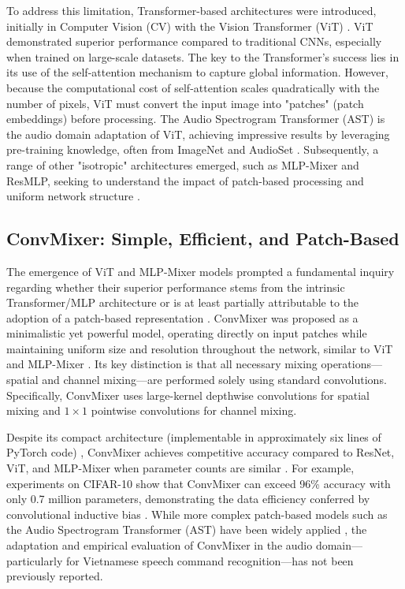 To address this limitation, Transformer-based architectures were introduced, initially in Computer Vision (CV) with the Vision Transformer (ViT) \cite{dosovitskiy2020image}. ViT demonstrated superior performance compared to traditional CNNs, especially when trained on large-scale datasets. The key to the Transformer's success lies in its use of the self-attention mechanism to capture global information. However, because the computational cost of self-attention scales quadratically with the number of pixels, ViT must convert the input image into "patches" (patch embeddings) before processing. The Audio Spectrogram Transformer (AST) is the audio domain adaptation of ViT, achieving impressive results by leveraging pre-training knowledge, often from ImageNet and AudioSet \cite{Gong2021AST, Deng2009ImageNet, Gemmeke2017AudioSet}. Subsequently, a range of other "isotropic" architectures emerged, such as MLP-Mixer and ResMLP, seeking to understand the impact of patch-based processing and uniform network structure \cite{Tolstikhin2021MLPMixer, Touvron2021ResMLP}.

\subsection*{ConvMixer: Simple, Efficient, and Patch-Based}

The emergence of ViT and MLP-Mixer models prompted a fundamental inquiry regarding whether their superior performance stems from the intrinsic Transformer/MLP architecture or is at least partially attributable to the adoption of a patch-based representation \cite{dosovitskiy2020image, Tolstikhin2021MLPMixer}. ConvMixer was proposed as a minimalistic yet powerful model, operating directly on input patches while maintaining uniform size and resolution throughout the network, similar to ViT and MLP-Mixer \cite{trockman2022patchesneed}. Its key distinction is that all necessary mixing operations—spatial and channel mixing—are performed solely using standard convolutions. Specifically, ConvMixer uses large-kernel depthwise convolutions for spatial mixing and $1\times 1$ pointwise convolutions for channel mixing.

Despite its compact architecture (implementable in approximately six lines of PyTorch code) \cite{Paszke2019PyTorch, trockman2022patchesneed}, ConvMixer achieves competitive accuracy compared to ResNet, ViT, and MLP-Mixer when parameter counts are similar \cite{trockman2022patchesneed}. For example, experiments on CIFAR-10 show that ConvMixer can exceed 96\% accuracy with only 0.7 million parameters, demonstrating the data efficiency conferred by convolutional inductive bias \cite{trockman2022patchesneed}. While more complex patch-based models such as the Audio Spectrogram Transformer (AST) have been widely applied \cite{Gong2021AST}, the adaptation and empirical evaluation of ConvMixer in the audio domain—particularly for Vietnamese speech command recognition—has not been previously reported. 

